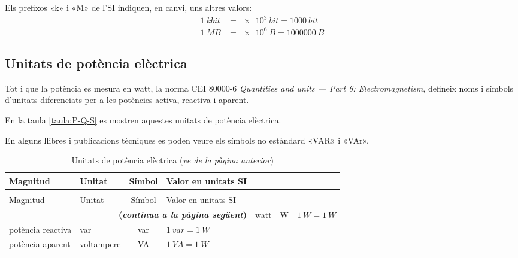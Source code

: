 Els prefixos «k» i «M» de l'SI indiquen, en canvi, uns altres valors:
\begin{align*}
	\qty{1}{kbit} &= \qty[print-unity-mantissa = false]{e3}{bit} = \qty{1000}{bit} \\
	\qty{1}{MB} &=\qty[print-unity-mantissa = false]{e6}{B} = \qty{1000000}{B}
\end{align*}


\subsection{Unitats de potència elèctrica}

Tot i que la potència es mesura en watt, la norma CEI 80000-6 \textit{Quantities and units --- Part 6: Electromagnetism}, defineix noms i símbols d'unitats diferenciats per a les potències activa, reactiva i aparent.

En la taula \vref{taula:P-Q-S} es mostren aquestes unitats de potència elèctrica.

\begin{ThreePartTable}
	\begin{TableNotes}
		\item[\color{blue}(a)] {\footnotesize En alguns llibres i publicacions tècniques es poden veure els símbols no estàndard «VAR» i «VAr».}
	\end{TableNotes}
\begin{longtable}[h]{llcl}
   \caption{\label{taula:P-Q-S} Unitats de potència elèctrica}\\
   \toprule[1pt]
    Magnitud & Unitat &  Símbol & Valor en unitats SI \\
   \midrule
   \endfirsthead
   \caption[]{Unitats de potència elèctrica (\emph{ve de la pàgina anterior})}\\
   \toprule[1pt]
    Magnitud & Unitat &  Símbol & Valor en unitats SI \\
   \midrule
   \endhead
   \midrule
   \multicolumn{4}{r}{\sffamily\bfseries\color{NavyBlue}(\emph{continua a la pàgina següent})}
   \endfoot
   \insertTableNotes
   \endlastfoot
   potència activa & watt &  \unit{W}& $\qty{1}{W} = \qty{1}{W}$  \\
   potència reactiva & var &  \unit{var}\tnote{\color{blue}(a)} & $\qty{1}{var} = \qty{1}{W}$  \\
   potència aparent & voltampere &  \unit{VA}& $\qty{1}{VA} = \qty{1}{W}$  \\
   \bottomrule[1pt]
\end{longtable}
\end{ThreePartTable}




